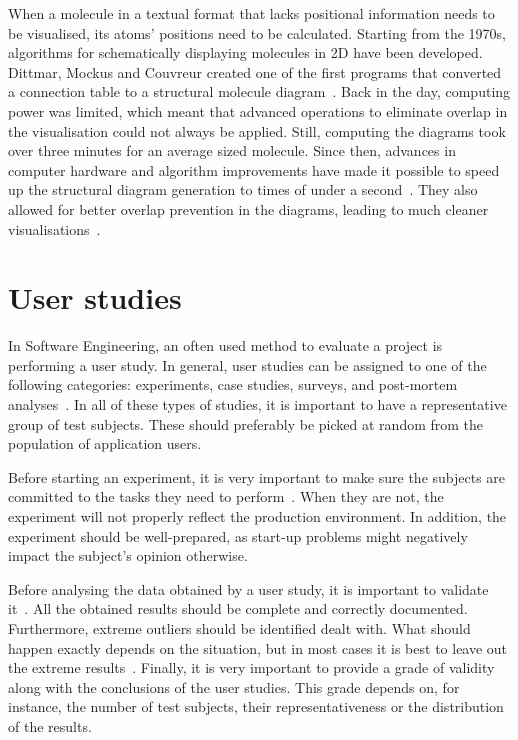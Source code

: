 When a molecule in a textual format that lacks positional information needs to be visualised, its atoms' positions need to be calculated. Starting from the 1970s, algorithms for schematically displaying molecules in 2D have been developed. Dittmar, Mockus and Couvreur created one of the first programs that converted a connection table to a structural molecule diagram~\cite{dittmar1977algorithmic}. Back in the day, computing power was limited, which meant that advanced operations to eliminate overlap in the visualisation could not always be applied. Still, computing the diagrams took over three minutes for an average sized molecule. Since then, advances in computer hardware and algorithm improvements have made it possible to speed up the structural diagram generation to times of under a second~\cite{fricker2004automated}. They also allowed for better overlap prevention in the diagrams, leading to much cleaner visualisations~\cite{clark2006structure}.



\section{User studies}
In Software Engineering, an often used method to evaluate a project is performing a user study. In general, user studies can be assigned to one of the following categories: experiments, case studies, surveys, and post-mortem analyses~\cite{wohlin2003empirical}. In all of these types of studies, it is important to have a representative group of test subjects. These should preferably be picked at random from the population of application users.

Before starting an experiment, it is very important to make sure the subjects are committed to the tasks they need to perform~\cite{stein2009assessing}. When they are not, the experiment will not properly reflect the production environment. In addition, the experiment should be well-prepared, as start-up problems might negatively impact the subject's opinion otherwise.

Before analysing the data obtained by a user study, it is important to validate it~\cite{wohlin2003empirical}. All the obtained results should be complete and correctly documented. Furthermore, extreme outliers should be identified dealt with. What should happen exactly depends on the situation, but in most cases it is best to leave out the extreme results~\cite{komarov2013crowdsourcing}. Finally, it is very important to provide a grade of validity along with the conclusions of the user studies. This grade depends on, for instance, the number of test subjects, their representativeness or the distribution of the results.
